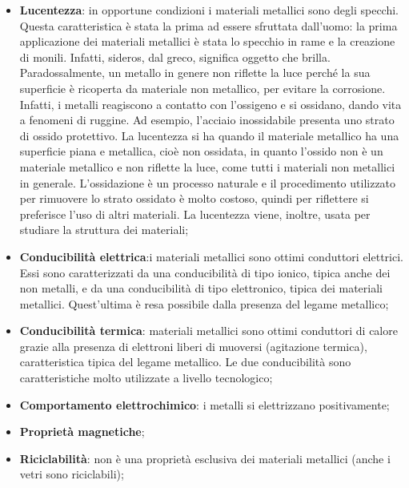 \begin{itemize} 
    \item \textbf{Lucentezza}: in opportune condizioni i materiali metallici sono degli specchi. Questa caratteristica è stata la prima ad essere sfruttata dall’uomo: la prima applicazione dei materiali metallici è stata lo specchio in rame e la creazione di monili. Infatti, sideros, dal greco, significa oggetto che brilla. Paradossalmente, un metallo in genere non riflette la luce perché la sua superficie è ricoperta da materiale non metallico, per evitare la corrosione. Infatti, i metalli reagiscono a contatto con l’ossigeno e si ossidano, dando vita a fenomeni di ruggine. Ad esempio, l’acciaio inossidabile presenta uno strato di ossido protettivo. La lucentezza si ha quando il materiale metallico ha una superficie piana e metallica, cioè non ossidata, in quanto l’ossido non è un materiale metallico e non riflette la luce, come tutti i materiali non metallici in generale. L’ossidazione è un processo naturale e il procedimento utilizzato per rimuovere lo strato ossidato è molto costoso, quindi per riflettere si preferisce l’uso di altri materiali. La lucentezza viene, inoltre, usata per studiare la struttura dei materiali;
    \item \textbf{Conducibilità elettrica}:i materiali metallici sono ottimi conduttori elettrici. Essi sono caratterizzati da una conducibilità di tipo ionico, tipica anche dei non metalli, e da una conducibilità di tipo elettronico, tipica dei materiali metallici. Quest’ultima è resa possibile dalla presenza del legame metallico;
    \item\textbf{Conducibilità termica}: materiali metallici sono ottimi conduttori di calore grazie alla presenza di elettroni liberi di muoversi (agitazione termica), caratteristica tipica del legame metallico. Le due conducibilità sono caratteristiche molto utilizzate a livello tecnologico;
    \item \textbf{Comportamento elettrochimico}: i metalli si elettrizzano positivamente;
    \item \textbf{Proprietà magnetiche};
    \item \textbf{Riciclabilità}: non è una proprietà esclusiva dei materiali metallici (anche i vetri sono riciclabili);

\end{itemize}
